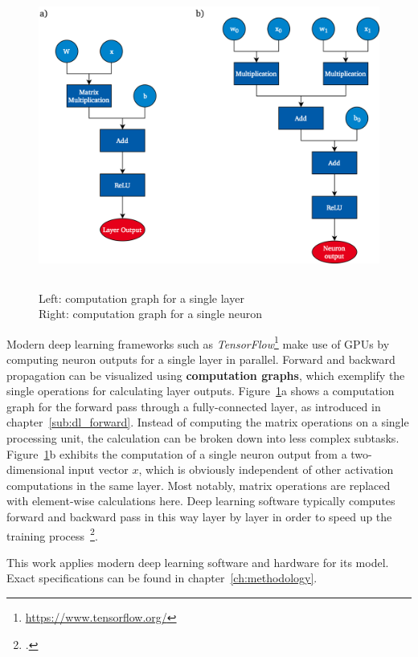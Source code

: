 \begin{figure}[h]
  \includegraphics[height=10cm]{img/computation_graph_3}
  \caption[Computation graph for single layer and neuron]{Left: computation graph for a single layer \\ Right: computation graph for a single neuron}
\label{fig:comp_graph}
\end{figure}

Modern deep learning frameworks such as \textit{TensorFlow}\footnote{\url{https://www.tensorflow.org/}}
make use of GPUs by computing neuron outputs for a single layer in parallel.
Forward and backward propagation can be visualized using \textbf{computation
graphs}, which exemplify the single operations for calculating layer outputs.
Figure~\ref{fig:comp_graph}a shows a computation graph for the forward
pass through a fully-connected layer, as introduced in chapter~\ref{sub:dl_forward}.
Instead of computing the matrix operations on a single processing unit, the
calculation can be broken down into less complex subtasks.
Figure~\ref{fig:comp_graph}b exhibits the computation of a single neuron output
from a two-dimensional input vector $x$, which is obviously independent of
other activation computations in the same layer.
Most notably, matrix operations are replaced with element-wise calculations here.
Deep learning software typically computes forward and backward pass in this way
layer by layer in order to speed up the training process~\footcite{Abadi2016}.

This work applies modern deep learning software and hardware for its model.
Exact specifications can be found in chapter~\ref{ch:methodology}.

